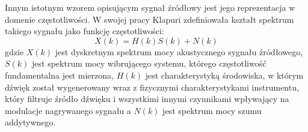 \documentclass[12pt,a4paper,twoside]{mwart}
\begin{document}
Innym istotnym wzorem opisującym sygnał źródłowy jest jego reprezentacja w domenie częstotliwości. W swojej pracy Klapuri \cite[806]{Transcription:Klapuri:MultipleFundamentalFrequencyEstimation} zdefiniowała kształt spektrum takiego sygnału jako funkcję częstotliwości:
\begin{equation}\label{eq:Klapuri:spectrum}
X(k) = H(k)S(k) + N(k)
\end{equation}
gdzie $X(k)$ jest dyskretnym spektrum mocy akustycznego sygnału źródłowego, $S(k)$ jest spektrum mocy wibrującego systemu, którego częstotliwość fundamentalna jest mierzona, $H(k)$ jest charakterystyką środowiska, w którym dźwięk został wygenerowany wraz z fizycznymi charakterystykami instrumentu, który filtruje źródło dźwięku i wszystkimi innymi czynnikami wpływający na modulacje nagrywanego sygnału a $N(k)$ jest spektrum mocy szumu addytywnego. 
\end{document}
